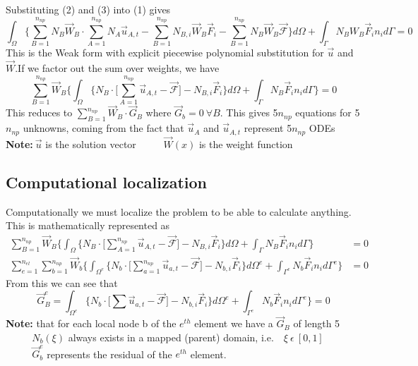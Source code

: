 \documentclass{article}
\begin{document}
Substituting (2) and (3) into (1) gives
\begin{equation}
\int_\Omega \bigg \{ \sum_{B=1}^{n_{np}}N_B\vec{W}_B \cdot \sum_{A=1}^{n_{np}}N_A\vec{u}_{A,t}-\sum_{B=1}^{n_{np}} N_{B,i}\vec{W}_{B} \vec{F}_i -\sum_{B=1}^{n_{np}}N_B\vec{W}_B\vec{\mathscr{F}}\bigg\}d\Omega +\int_\Gamma N_BW_B\vec{F}_in_id\Gamma=0
\end{equation}
This is the Weak form with explicit piecewise polynomial substitution for $\vec{u}$ and $\vec{W}$.If we factor out the sum over weights, we have
\begin{equation}
\sum_{B=1}^{n_{np}}\vec{W}_B \Bigg \{ \int_\Omega \bigg \{ N_B \cdot \Big[ \sum_{A=1}^{n_{np}}\vec{u}_{A,t}-\vec{\mathscr{F}}\Big]- N_{B,i} \vec{F}_i \bigg\}d\Omega +\int_\Gamma N_B\vec{F}_in_id\Gamma \Bigg \}=0
\end{equation}
\noindent
This reduces to $\sum_{B=1}^{n_{np}}\vec{W}_B \cdot \vec{G}_B$ where $\vec{G}_b=0~\forall B$. This gives 5$n_{np}$ equations for 5$n_{np}$ unknowns, coming from the fact that $\vec{u}_A$ and $\vec{u}_{A,t}$ represent 5$n_{np}$ ODEs
\vskip 0.08in \noindent \textbf{Note:}$~\vec{u}$ is the solution vector
\newline $~~~~~~~~~~~ \vec{W}(x)$ is the weight function


\subsection{Computational localization}%
Computationally we must localize the problem to be able to calculate anything. This is mathematically represented as 
\begin{equation}
\begin{split}
\sum_{B=1}^{n_{np}}\vec{W}_B \Bigg \{ \int_\Omega \bigg \{ N_B \cdot \Big[ \sum_{A=1}^{n_{np}}\vec{u}_{A,t}-\vec{\mathscr{F}}\Big]- N_{B,i} \vec{F}_i \bigg\}d\Omega +\int_\Gamma N_B\vec{F}_in_id\Gamma \Bigg \}&=0\\
\sum_{e=1}^{n_{el}}\sum_{b=1}^{n_{np}}\vec{W}_b \Bigg \{ \int_{\Omega ^e} \bigg \{ N_b \cdot \Big[ \sum_{a=1}^{n_{np}}\vec{u}_{a,t}-\vec{\mathscr{F}}\Big]- N_{b,i} \vec{F}_i \bigg\}d\Omega ^e +\int_{\Gamma ^e} N_b\vec{F}_in_id\Gamma ^e \Bigg \}&=0
\end{split}
\end{equation}
From this we can see that
\begin{equation}
\vec{G}_B^e = \int_{\Omega ^e}  \bigg \{ N_b \cdot \Big[ \sum \vec{u}_{a,t}-\vec{\mathscr{F}}\Big]- N_{b,i} \vec{F}_i \bigg\}d\Omega ^e +\int_
{\Gamma ^e} N_b\vec{F}_in_id\Gamma ^e \Bigg \}=0
\end{equation}
\textbf{Note:} that for each local node b of the $e^{th}$ element we have a $\vec{G}_B$ of length 5
\newline $~~~~~~~~~~~~ N_b(\xi)$ always exists in a mapped (parent) domain, i.e.~~$\xi ~\epsilon ~\left[ 0,1\right]$
\newline $~~~~~~~~~~~~ \vec{G}_b^e$ represents the residual of the $e^{th}$ element.
\end{document}
